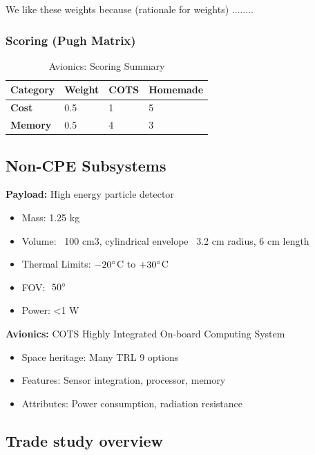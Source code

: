 We like these weights because (rationale for weights) ........ 

\subsubsection{Scoring (Pugh Matrix)}

\begin{table}[H]
\centering
\begin{tabular}{|l|l|l|l|} 
\hline
    \textbf{Category} & \textbf{Weight} & \textbf{COTS} & \textbf{Homemade}
    \\
\hline
    \textbf{Cost} & 0.5 & 1 & 5
    \\
\hline
    \textbf{Memory} & 0.5 & 4 & 3
    \\
\hline
\end{tabular}
\caption{Avionics: Scoring Summary \cite{Boain}}
\label{tbl:avionicsscoresy}
\end{table}


\subsection{Non-CPE Subsystems}
\noindent\textbf{Payload:} High energy particle detector
\begin{itemize}
    \item Mass: 1.25 kg
    \item Volume: ~100 cm3, cylindrical envelope ~3.2 cm radius, 6 cm length
    \item Thermal Limits: $-20\degree$C to $+30\degree$C
    \item FOV: $~50\degree$
    \item Power: <1 W
\end{itemize}

\noindent\textbf{Avionics:} COTS Highly Integrated On-board Computing System
\begin{itemize}
    \item Space heritage: Many TRL 9 options
    \item Features: Sensor integration, processor, memory
    \item Attributes: Power consumption, radiation resistance
\end{itemize}


\subsection{Trade study overview}
